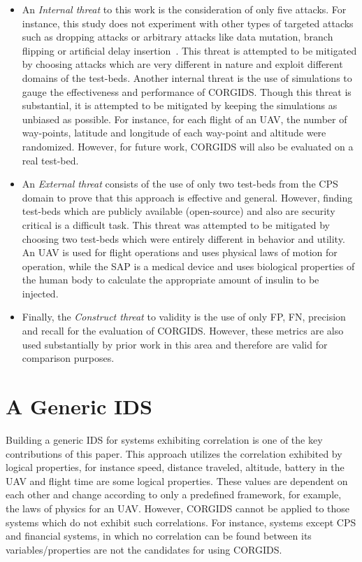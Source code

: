 \begin{itemize}
\item An \textit{Internal threat} to this work is the consideration of only five attacks. For instance, this study does not experiment with other types of targeted attacks such as dropping attacks or arbitrary attacks like data mutation, branch flipping or artificial delay insertion~\cite{aliabadi2017artinali}. This threat is  attempted to be mitigated by choosing attacks which are very different in nature and exploit different domains of the test-beds. Another internal threat is the use of simulations to gauge the effectiveness and performance of \ac{CORGIDS}. Though this threat is substantial, it is attempted to be mitigated by keeping the simulations as unbiased as possible. For instance, for each flight of an \ac{UAV}, the number of way-points, latitude and longitude of each way-point and altitude were randomized. However, for future work, \ac{CORGIDS} will also be evaluated on a real test-bed. 

\item An \textit{External threat} consists of the use of only two test-beds from the \ac{CPS} domain to prove that this approach is effective and general. However, finding test-beds which are publicly available (open-source) and also are security critical is a difficult task. This threat was attempted to be mitigated by choosing two test-beds which were entirely different in behavior and utility. An \ac{UAV} is used for flight operations and uses physical laws of motion for operation, while the SAP is a medical device and uses biological properties of the human body to calculate the appropriate amount of insulin to be injected. 

\item Finally, the \textit{Construct  threat} to validity is the use of only \ac{FP}, \ac{FN}, precision and recall for the evaluation of \ac{CORGIDS}. However, these metrics are also used substantially by prior work in this area and therefore are valid for comparison purposes. 
\end{itemize}

\section{A Generic IDS}
Building a generic \ac{IDS} for systems exhibiting correlation is one of the key contributions of this paper. This approach utilizes the correlation exhibited by logical properties, for instance speed, distance traveled, altitude, battery in the \ac{UAV} and flight time are some logical properties. These values are dependent on each other and change according to only a predefined framework, for example, the laws of physics for an \ac{UAV}. However, \ac{CORGIDS} cannot be applied to those systems which do not exhibit such correlations. For instance, systems except \ac{CPS} and financial systems, in which no correlation can be found between its variables/properties are not the candidates for using \ac{CORGIDS}.

